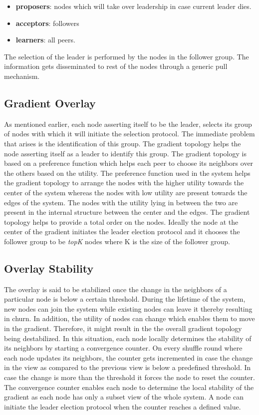 \documentclass[a4paper,11pt]{kth-mag}
\begin{document}
\begin{itemize}

\item \textbf{proposers}: nodes which will take over leadership in case current leader dies.
\item \textbf{acceptors}: followers
\item \textbf{learners}: all peers.

\end{itemize}

The selection of the leader is performed by the nodes in the follower group. The information gets disseminated to rest of the nodes through a generic pull mechanism.

\subsection{Gradient Overlay}

As mentioned earlier, each node asserting itself to be the leader, selects its group of nodes with which it will initiate the selection protocol. The immediate problem that arises is the identification of this group. The gradient topology helps the node asserting itself as a leader to identify this group. The gradient topology is based on a preference function which helps each peer to choose its neighbors over the others based on the utility. The preference function used in the system helps the gradient topology to arrange the nodes with the higher utility towards the center of the system whereas the nodes with low utility are present towards the edges of the system. The nodes with the utility lying in between the two are present in the internal structure between the center and the edges. The gradient topology helps to provide a total order on the nodes. Ideally the node at the center of the gradient initiates the leader election protocol and it chooses the follower group to be \textit{topK} nodes where K is the size of the follower group.


\subsection{Overlay Stability}

The overlay is said to be stabilized once the change in the neighbors of a particular node is below a certain threshold. During the lifetime of the system, new nodes can join the system while existing nodes can leave it thereby resulting in churn. In addition, the utility of nodes can change which enables them to move in the gradient. Therefore, it might result in the the overall gradient topology being destabilized. In this situation, each node locally determines the stability of its neighbors by starting a convergence counter. On every shuffle round where each node updates its neighbors, the counter gets incremented in case the change in the view as compared to the previous view is below a predefined threshold. In case the change is more than the threshold it forces the node to reset the counter. The convergence counter enables each node to determine the local stability of the gradient as each node has only a subset view of the whole system. A node can initiate the leader election protocol when the counter reaches a defined value.
\end{document}
